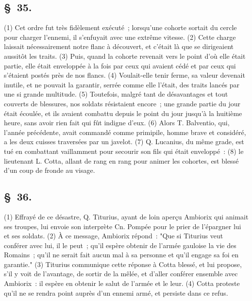 \documentclass[french,twoside]{book} %
\begin{document}
\subsection[{§ 35.}]{ \textsc{§ 35.} }
\noindent (1) Cet ordre fut très fidèlement exécuté ; lorsqu’une cohorte sortait du cercle pour charger l’ennemi, il s’enfuyait avec une extrême vitesse. (2) Cette charge laissait nécessairement notre flanc à découvert, et c’était là que se dirigeaient aussitôt les traits. (3) Puis, quand la cohorte revenait vers le point d’où elle était partie, elle était enveloppée à la fois par ceux qui avaient cédé et par ceux qui s’étaient postés près de nos flancs. (4) Voulait-elle tenir ferme, sa valeur devenait inutile, et ne pouvait la garantir, serrée comme elle l’était, des traits lancés par une si grande multitude. (5) Toutefois, malgré tant de désavantages et tout couverts de blessures, nos soldats résistaient encore ; une grande partie du jour était écoulée, et ils avaient combattu depuis le point du jour jusqu’à la huitième heure, sans avoir rien fait qui fût indigne d’eux. (6) Alors T. Balventio, qui, l’année précédente, avait commandé comme primipile, homme brave et considéré, a les deux cuisses traversées par un javelot. (7) Q. Lucanius, du même grade, est tué en combattant vaillamment pour secourir son fils qui était enveloppé : (8) le lieutenant L. Cotta, allant de rang en rang pour animer les cohortes, est blessé d’un coup de fronde au visage.
\subsection[{§ 36.}]{ \textsc{§ 36.} }
\noindent (1) Effrayé de ce désastre, Q. Titurius, ayant de loin aperçu Ambiorix qui animait ses troupes, lui envoie son interprète Cn. Pompée pour le prier de l’épargner lui et ses soldats. (2) À ce message, Ambiorix répond : "Que si Titurius veut conférer avec lui, il le peut ; qu’il espère obtenir de l’armée gauloise la vie des Romains ; qu’il ne serait fait aucun mal à sa personne et qu’il engage sa foi en garantie." (3) Titurius communique cette réponse à Cotta blessé, et lui propose, s’il y voit de l’avantage, de sortir de la mêlée, et d’aller conférer ensemble avec Ambiorix : il espère en obtenir le salut de l’armée et le leur. (4) Cotta proteste qu’il ne se rendra point auprès d’un ennemi armé, et persiste dans ce refus.
\end{document}
